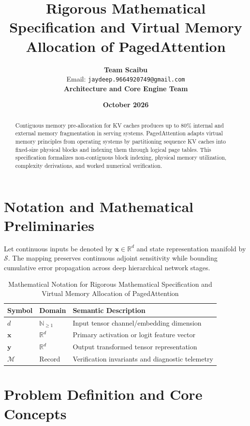 \documentclass[11pt,a4paper]{article}
\title{\textbf{Rigorous Mathematical Specification and Virtual Memory Allocation of PagedAttention}}
\author{\textbf{Team Scaibu} \\ \small Email: \texttt{jaydeep.9664920749@gmail.com} \\ \small \textbf{Architecture and Core Engine Team}}
\date{\textbf{October 2026}}
\theoremstyle{definition}
\begin{document}
\maketitle

\begin{abstract}
Contiguous memory pre-allocation for KV caches produces up to $80\%$ internal and external memory fragmentation in serving systems. PagedAttention adapts virtual memory principles from operating systems by partitioning sequence KV caches into fixed-size physical blocks and indexing them through logical page tables. This specification formalizes non-contiguous block indexing, physical memory utilization, complexity derivations, and worked numerical verification.
\end{abstract}

\section{Notation and Mathematical Preliminaries}

Let continuous inputs be denoted by $\mathbf{x} \in \mathbb{R}^d$ and state representation manifold by $\mathcal{S}$. The mapping preserves continuous adjoint sensitivity while bounding cumulative error propagation across deep hierarchical network stages.

\begin{table}[h]
\centering
\caption{Mathematical Notation for Rigorous Mathematical Specification and Virtual Memory Allocation of PagedAttention}
\begin{tabular}{lll}
\toprule
\textbf{Symbol} & \textbf{Domain} & \textbf{Semantic Description} \\
\midrule
$d$ & $\mathbb{N}_{\ge 1}$ & Input tensor channel/embedding dimension \\
$\mathbf{x}$ & $\mathbb{R}^d$ & Primary activation or logit feature vector \\
$\mathbf{y}$ & $\mathbb{R}^d$ & Output transformed tensor representation \\
$\mathcal{M}$ & Record & Verification invariants and diagnostic telemetry \\
\bottomrule
\end{tabular}
\end{table}

\section{Problem Definition and Core Concepts}
\end{document}
